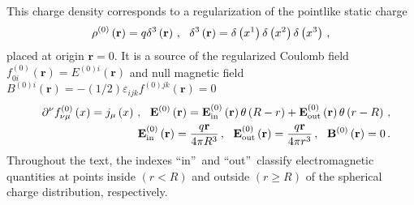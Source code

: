 \documentclass[12pt]{article}
\begin{document}
This charge density corresponds to a regularization of the pointlike static
charge%
\begin{equation}
\rho ^{\left( 0\right) }\left( \mathbf{r}\right) =q\delta ^{3}\left( \mathbf{%
r}\right) \,,\ \ \delta ^{3}\left( \mathbf{r}\right) =\delta \left(
x^{1}\right) \delta \left( x^{2}\right) \delta \left( x^{3}\right) \,,
\label{pointlike}
\end{equation}%
placed at origin $\mathbf{r}=0$. It is a source of the regularized Coulomb
field $f_{0i}^{\left( 0\right) }\left( \mathbf{r}\right) =E^{\left( 0\right)
i}\left( \mathbf{r}\right) $ and null magnetic field $B^{\left( 0\right)
i}\left( \mathbf{r}\right) =-\left( 1/2\right) \varepsilon _{ijk}f^{\left(
0\right) jk}\left( \mathbf{r}\right) =0$%
\begin{eqnarray}
&&\partial ^{\nu }f_{\nu \mu }^{\left( 0\right) }\left( x\right) =j_{\mu
}\left( x\right) \,,\ \ \mathbf{E}^{(0)}\left( \mathbf{r}\right) =\mathbf{E}%
_{\mathrm{in}}^{\left( 0\right) }\left( \mathbf{r}\right) \theta \left(
R-r\right) +\mathbf{E}_{\mathrm{out}}^{\left( 0\right) }\left( \mathbf{r}%
\right) \theta \left( r-R\right) \,,  \notag \\
&&\mathbf{E}_{\mathrm{in}}^{\left( 0\right) }\left( \mathbf{r}\right) =\frac{%
q\mathbf{r}}{4\pi R^{3}}\,,\ \ \mathbf{E}_{\mathrm{out}}^{\left( 0\right)
}\left( \mathbf{r}\right) =\frac{q\mathbf{r}}{4\pi r^{3}}\,,\ \ \mathbf{B}%
^{\left( 0\right) }\left( \mathbf{r}\right) =0\,.  \label{in2}
\end{eqnarray}%
Throughout the text, the indexes \textquotedblleft in\textquotedblright\ and
\textquotedblleft out\textquotedblright\ classify electromagnetic quantities
at points inside $(r<R)$ and outside $(r\geq R)$ of the spherical charge
distribution, respectively.
\end{document}
